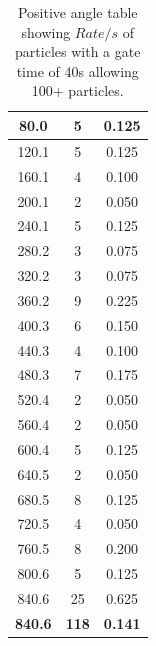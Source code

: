 \documentclass[12pt]{article}
\begin{document}
\begin{table}[H]
\begin{center}
\begin{multicols}{3}
\begin{tabular}{|c|c|c|}
 \hline
 80.0 & 5 & 0.125 \\
 \hline 
 120.1 & 5 & 0.125 \\
 \hline
 160.1 & 4 & 0.100 \\
 \hline 
 200.1 & 2 & 0.050 \\
 \hline
 240.1 & 5 & 0.125 \\
 \hline
 280.2 & 3 & 0.075 \\
 \hline 
 320.2 & 3 & 0.075 \\
 \hline
 360.2 & 9 & 0.225 \\
 \hline 
 400.3 & 6 & 0.150 \\
 \hline
 440.3 & 4 & 0.100 \\
 \hline 
 480.3 & 7 & 0.175 \\
 \hline 
 520.4 & 2 & 0.050 \\
 \hline
 560.4 & 2 & 0.050 \\
 \hline 
 600.4 & 5 & 0.125 \\
 \hline
 640.5 & 2 & 0.050 \\
 \hline 
 680.5 & 8 & 0.125 \\
 \hline
 720.5 & 4 & 0.050 \\
 \hline
 760.5 & 8 & 0.200\\
 \hline 
 800.6 & 5 & 0.125 \\
 \hline
 840.6 & 25 & 0.625 \\
 \hline \hline
 \textbf{840.6} & \textbf{118} & \textbf{0.141} \\
 \hline
 \end{tabular}
\end{multicols}
\caption{Positive angle table showing $Rate/s$ of particles with a gate time of 40s allowing 100+ particles.}
\label{2.1.2 Positive Table Appendix}
\end{center}
\end{table}
\end{document}
